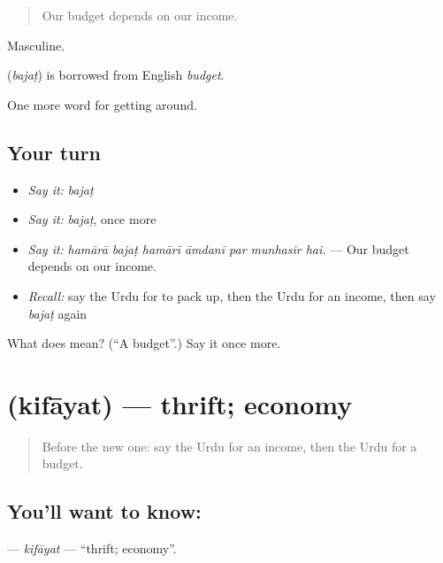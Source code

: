 \begin{quote}
Our budget depends on our income.
\end{quote}

Masculine.

\begin{cousinweb}
\textbf{} (\emph{bajaṭ}) is borrowed from English \emph{budget}.
\end{cousinweb}

\begin{grammarlens}[title={What you've built}]
One more word for getting around.
\end{grammarlens}

\subsection*{Your turn}
\begin{itemize}
\raggedright
  \item \emph{Say it:} \emph{bajaṭ}
  \item \emph{Say it:} \emph{bajaṭ}, once more
  \item \emph{Say it:} \emph{hamārā bajaṭ hamārī āmdanī par munhasir hai.} — Our budget depends on our income.
  \item \emph{Recall:} say the Urdu for to pack up, then the Urdu for an income, then say \emph{bajaṭ} again
\end{itemize}

\begin{tcolorbox}[breakable,colback=teal!4,colframe=teal!35!black,title={Before you move on}]
What does  mean? (\textquotedblleft{}A budget\textquotedblright{}.) Say it once more.
\end{tcolorbox}
\section[\texorpdfstring{\ur{کفایت} (kifāyat)}{کفایت (kifāyat)}]{ (kifāyat) — thrift; economy}

\label{lesson:UR-C420-kifayat}



\begin{quote}
Before the new one: say the Urdu for an income, then the Urdu for a budget.
\end{quote}

\subsection*{You'll want to know: }
\textbf{} — \emph{kifāyat} — \textquotedblleft{}thrift; economy\textquotedblright{}.

